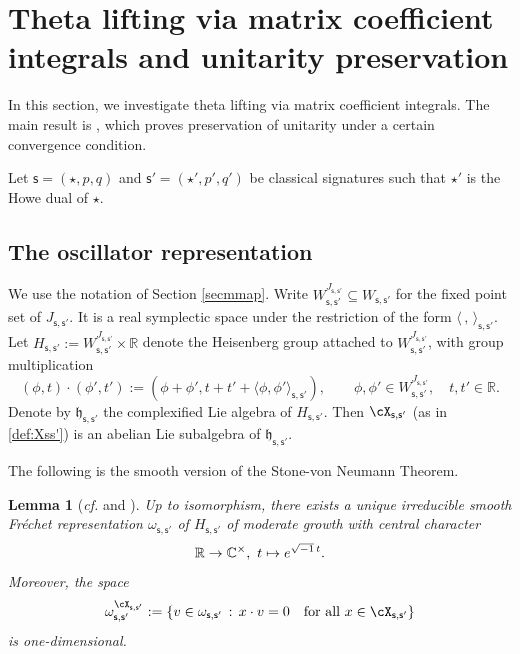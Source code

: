 \documentclass[11pt,a4paper]{amsart}
\newcommand{\h}{\mathfrak h}
\newcommand{\R}{\mathbb R}
\newcommand{\la}{\langle}
\newcommand{\ra}{\rangle}
\numberwithin{equation}{section}
\newtheorem{lem}[thm]{Lemma}
\theoremstyle{remark}
\def\subset{\subseteq}
\def\cf{\emph{cf.} }
\begin{document}
\section{Theta lifting via matrix coefficient integrals and unitarity preservation}\label{sec:Integrals}

In this section,
we investigate theta lifting via
matrix coefficient integrals. The main result is , which proves preservation of unitarity under a certain convergence condition.  

Let $\mathsf s=(\star, p,q)$ and $ \mathsf s'=(\star', p',q')$ be classical signatures such that $\star'$ is the Howe dual of $\star$.

\subsection{The oscillator representation}\label{secoscil}
We use the notation of Section \ref{secmmap}. Write
$
  W_{\mathsf s, \mathsf s'}^{J_{\mathsf s, \mathsf s'}}\subset W_{\mathsf s, \mathsf s'}
$
for the fixed point set of $J_{\mathsf s, \mathsf s'}$. It is a real symplectic space under the restriction of the form $\la\,,\,\ra_{\mathsf s, \mathsf s'}$. Let $H_{\mathsf s, \mathsf s'}:= W_{\mathsf s, \mathsf s'}^{J_{\mathsf s, \mathsf s'}}\times \R$
denote the Heisenberg group attached to $W_{\mathsf s, \mathsf s'}^{J_{\mathsf s, \mathsf s'}}$, with group multiplication
\[
  (\phi ,t)\cdot (\phi ', t'):=(\phi +\phi ', t+t'+\la \phi , \phi '\ra_{\mathsf s, \mathsf s'}), \qquad \phi ,\phi '\in  W_{\mathsf s, \mathsf s'}^{J_{\mathsf s, \mathsf s'}}, \quad t, t'\in \R.
\]
Denote by $\h_{\mathsf s, \mathsf s'}$ the complexified Lie algebra of $H_{\mathsf s, \mathsf s'}$. Then  $\cX_{\mathsf s, \mathsf s'}$ (as in \eqref{def:Xss'}) is  an abelian Lie subalgebra of $\h_{\mathsf s, \mathsf s'}$.

The following is the smooth version of the Stone-von Neumann Theorem.

\begin{lem}[{\cf \cite[Theorem 5.1]{Cl89} and \cite[Section 4]{Ad07}}]\label{vn}
Up to isomorphism, there exists a unique irreducible smooth Fr\'echet representation $\omega_{\mathsf s, \mathsf s'}$ of $H_{\mathsf s, \mathsf s'}$ of moderate growth 
with central character
\[
\R\rightarrow \C^\times, \ t\mapsto e^{\sqrt{-1}\, t}.
\]
Moreover, the space
\[
  \omega_{\mathsf s, \mathsf s'}^{\cX_{\mathsf s, \mathsf s'}}:=\{v\in \omega_{\mathsf s, \mathsf s'}\,:\, x \cdot v=0\quad \textrm{for all $x\in \cX_{\mathsf s, \mathsf s'}$}\}
\]
is one-dimensional.
\end{lem}
\end{document}
